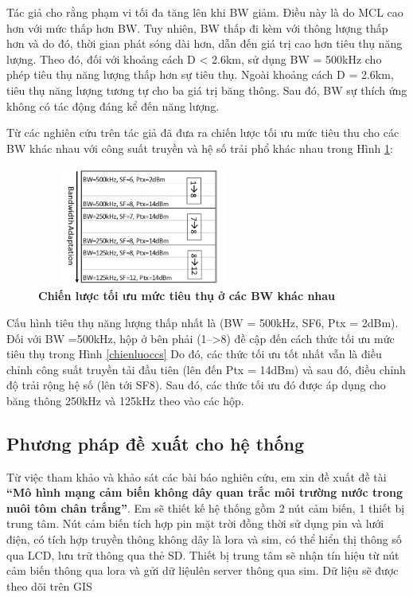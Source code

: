 \documentclass{article} %
\begin{document}
	Tác giả cho rằng phạm vi tối đa tăng lên khi BW giảm. Điều này là do MCL cao hơn với mức thấp hơn BW. Tuy nhiên, BW thấp đi kèm với thông lượng thấp hơn và do đó, thời gian phát sóng dài hơn, dẫn đến giá trị cao hơn tiêu thụ năng lượng. Theo đó, đối với khoảng cách D < 2.6km, sử dụng BW = 500kHz cho phép tiêu thụ năng lượng thấp hơn sự tiêu thụ. Ngoài khoảng cách D = 2.6km, tiêu thụ năng lượng tương tự cho ba giá trị băng thông. Sau đó, BW sự thích ứng không có tác động đáng kể đến năng lượng.
	
	Từ các nghiên cứu trên tác giả đã đưa ra chiến lược tối ưu mức tiêu thu cho các 
	BW khác nhau với công suất truyền và hệ số trải phổ khác nhau trong Hình \ref{toiuuallBW}:
	
	\begin{figure}[!ht]
		\centering
		\includegraphics[width=7cm,height=3.9cm]{Images/toiuuallBW.png}
		\caption[Chiến lược tối ưu mức tiêu thụ ở các BW khác nhau \cite{ochoa2017evaluating}]
		{\bfseries \fontsize{12pt}{0pt}\selectfont Chiến lược tối ưu mức tiêu thụ ở các BW khác nhau \cite{ochoa2017evaluating}}
		\label{toiuuallBW}
	\end{figure}
	
	Cấu hình tiêu thụ năng lượng thấp nhất là (BW = 500kHz, SF6, Ptx = 2dBm). Đối với BW =500kHz, hộp ở bên phải (1–>8) đề cập đến cách thức tối ưu mức tiêu thụ trong Hình \ref{chienluoccs} Do đó, các thức tối ưu tốt nhất vẫn là điều chỉnh công suất truyền tải đầu tiên (lên đến Ptx = 14dBm) và sau đó, điều chỉnh độ trải rộng hệ số (lên tới SF8). Sau đó, các thức tối ưu đó được áp dụng cho băng thông 250kHz và 125kHz theo vào các hộp.
	
	\subsection{Phương pháp đề xuất cho hệ thống}
	
	Từ việc tham khảo và khảo sát các bài báo nghiên cứu, em xin đề xuất đề tài \textbf{“Mô hình mạng cảm biến không dây quan trắc môi trường nước trong nuôi tôm chân trắng”}. Em sẽ thiết kế hệ thống gồm 2 nút cảm biến, 1 thiết bị trung tâm. Nút cảm biến tích hợp pin mặt trời đồng thời sử dụng pin và lưới điện, có tích hợp truyền thông không dây là lora và sim, có thể hiển thị thông số qua LCD, lưu trữ thông qua thẻ SD. Thiết bị trung tâm sẽ nhận tín hiệu từ nút cảm biến thông qua lora và gửi dữ liệulên server thông qua sim. Dữ liệu sẽ được theo dõi trên GIS
	
\end{document}
